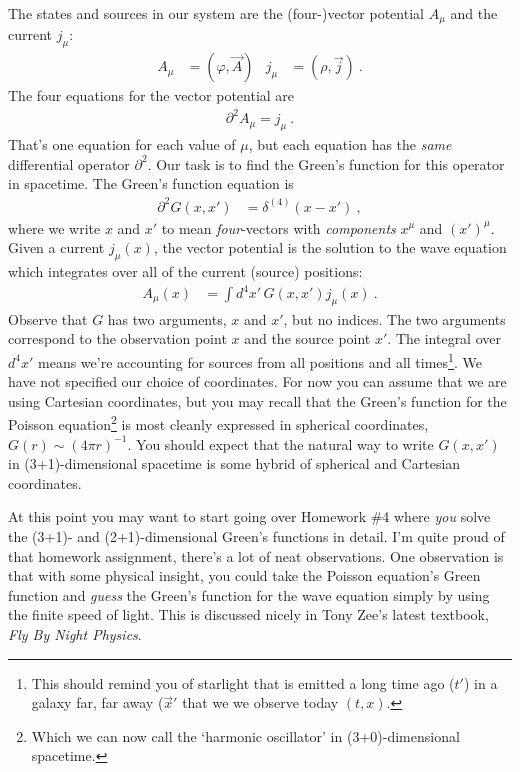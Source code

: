 The states and sources in our system are the (four-)vector potential $A_\mu$ and the current $j_\mu$: 
\begin{align}
  A_\mu &= (\varphi, \vec{A})
  &
  j_\mu &= (\rho, \vec{j}) \ .
\end{align}
The four equations for the vector potential are
\begin{align}
  \partial^2 A_\mu = j_\mu \ .
\end{align}
That's one equation for each value of $\mu$, but each equation has the \emph{same} differential operator $\partial^2$. Our task is to find the Green's function for this operator in spacetime. The Green's function equation is
\begin{align}
  \partial^2 G(x,x') &= \delta^{(4)}(x-x') \ ,
  \label{eq:wave:eq:Greens:eq}
\end{align}
where we write $x$ and $x'$ to mean \emph{four}-vectors with \emph{components} $x^\mu$ and $(x')^\mu$. Given a current $j_\mu(x)$, the vector potential is the solution to the wave equation which integrates over all of the current (source) positions:
\begin{align}
  A_\mu(x) &= \int d^4x' \, G(x,x') j_\mu(x) \ .
\end{align}
Observe that $G$ has two arguments, $x$ and $x'$, but no indices. The two arguments correspond to the observation point $x$ and the source point $x'$. The integral over $d^4x'$ means we're accounting for sources from all positions and all times\footnote{This should remind you of starlight that is emitted a long time ago ($t'$) in a galaxy far, far away ($\vec{x}'$ that we we observe today $(t,x)$.}. We have not specified our choice of coordinates. For now you can assume that we are using Cartesian coordinates, but you may recall that the Green's function for the Poisson equation\footnote{Which we can now call the `harmonic oscillator' in (3+0)-dimensional spacetime.} is most cleanly expressed in spherical coordinates, $G(r)\sim (4\pi r)^{-1}$. You should expect that the natural way to write $G(x,x')$ in (3+1)-dimensional spacetime is some hybrid of spherical and Cartesian coordinates.

\begin{exercise}\label{ex:guess:Greens}
At this point you may want to start going over Homework \#4 where \emph{you} solve the (3+1)- and (2+1)-dimensional Green's functions in detail. I'm quite proud of that homework assignment, there's a lot of neat observations. One observation is that with some physical insight, you could take the Poisson equation's Green function and \emph{guess} the Green's function for the wave equation simply by using the finite speed of light. This is discussed nicely in Tony Zee's latest textbook, \emph{Fly By Night Physics}. 
\end{exercise}


